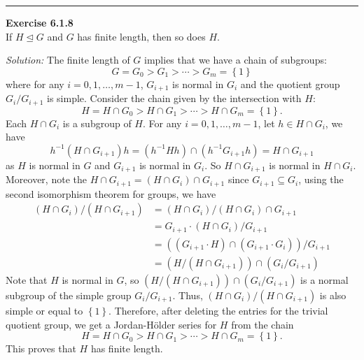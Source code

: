 \documentclass[a4paper, 12pt]{article}
\newenvironment{problem}[2][Exercise]
    { \begin{mdframed}[backgroundcolor=gray!20] \textbf{#1 #2} \\}
    {  \end{mdframed}}
\newenvironment{solution}
    {\textit{Solution:}}
    {}
\begin{document}
\noindent\rule{7in}{2.8pt}
\begin{problem}{6.1.8}
If \(H\unlhd G\) and \(G\) has finite length, then so does \(H\).
\end{problem}
\begin{solution}
The finite length of \(G\) implies that we have a chain of subgroups:
\[G=G_0>G_1>\cdots>G_m=\left\{ 1 \right\}\]
where for any \(i=0,1,\ldots,m-1\), \(G_{i+1}\) is normal in \(G_i\) and the quotient group \(G_i/G_{i+1}\) is simple. Consider the chain given by the intersection with \(H\): 
\[H=H\cap G_0>H\cap G_1>\cdots>H\cap G_m=\left\{ 1 \right\}.\]
Each \(H\cap G_i\) is a subgroup of \(H\). For any \(i=0,1,\ldots,m-1\), let \(h\in H\cap G_i\), we have 
\[h^{-1}(H\cap G_{i+1})h=(h^{-1}H h)\cap(h^{-1}G_{i+1} h)=H\cap G_{i+1}\]
as \(H\) is normal in \(G\) and \(G_{i+1}\) is normal in \(G_i\). So \(H\cap G_{i+1}\) is normal in \(H\cap G_i\). Moreover, note the \(H\cap G_{i+1}=(H\cap G_i)\cap G_{i+1}\) since \(G_{i+1}\subseteq G_i\), using the second isomorphism theorem for groups, we have 
\begin{align*}
	(H\cap G_i)/(H\cap G_{i+1}) & =(H\cap G_i)/(H\cap G_i)\cap G_{i+1}\\ 
	                            & =G_{i+1}\cdot (H\cap G_i)/G_{i+1}\\ 
								& =((G_{i+1}\cdot H)\cap (G_{i+1}\cdot G_i))/G_{i+1}\\ 
								& =(H/(H\cap G_{i+1}))\cap (G_i/G_{i+1})
\end{align*}
Note that \(H\) is normal in \(G\), so \((H/(H\cap G_{i+1}))\cap (G_i/G_{i+1})\) is a normal subgroup of the simple group \(G_i/G_{i+1}\). Thus, \((H\cap G_i)/(H\cap G_{i+1})\) is also simple or equal to \(\left\{ 1 \right\}\). Therefore, after deleting the entries for the trivial quotient group, we 
get a Jordan-H\"{o}lder series for \(H\) from the chain 
\[H=H\cap G_0>H\cap G_1>\cdots>H\cap G_m=\left\{ 1 \right\}.\]
This proves that \(H\) has finite length.
\end{solution}
\end{document}
